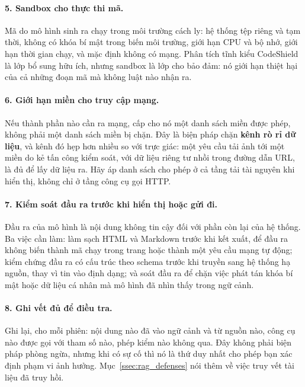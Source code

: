 \paragraph{5. Sandbox cho thực thi mã.} Mã do mô hình sinh ra chạy trong môi trường cách ly: hệ thống tệp riêng và tạm thời, không có khóa bí mật trong biến môi trường, giới hạn CPU và bộ nhớ, giới hạn thời gian chạy, và mặc định không có mạng. Phân tích tĩnh kiểu CodeShield là lớp bổ sung hữu ích, nhưng sandbox là lớp cho bảo đảm: nó giới hạn thiệt hại của cả những đoạn mã mà không luật nào nhận ra.

\paragraph{6. Giới hạn miền cho truy cập mạng.} Nếu thành phần nào cần ra mạng, cấp cho nó một danh sách miền được phép, không phải một danh sách miền bị chặn. Đây là biện pháp chặn \textbf{kênh rò rỉ dữ liệu}, và kênh đó hẹp hơn nhiều so với trực giác: một yêu cầu tải ảnh tới một miền do kẻ tấn công kiểm soát, với dữ liệu riêng tư nhồi trong đường dẫn URL, là đủ để lấy dữ liệu ra. Hãy áp danh sách cho phép ở cả tầng tải tài nguyên khi hiển thị, không chỉ ở tầng công cụ gọi HTTP.

\paragraph{7. Kiểm soát đầu ra trước khi hiển thị hoặc gửi đi.} Đầu ra của mô hình là nội dung không tin cậy đối với phần còn lại của hệ thống. Ba việc cần làm: làm sạch HTML và Markdown trước khi kết xuất, để đầu ra không biến thành mã chạy trong trang hoặc thành một yêu cầu mạng tự động; kiểm chứng đầu ra có cấu trúc theo schema trước khi truyền sang hệ thống hạ nguồn, thay vì tin vào định dạng; và soát đầu ra để chặn việc phát tán khóa bí mật hoặc dữ liệu cá nhân mà mô hình đã nhìn thấy trong ngữ cảnh.

\paragraph{8. Ghi vết đủ để điều tra.} Ghi lại, cho mỗi phiên: nội dung nào đã vào ngữ cảnh và từ nguồn nào, công cụ nào được gọi với tham số nào, phép kiểm nào không qua. Đây không phải biện pháp phòng ngừa, nhưng khi có sự cố thì nó là thứ duy nhất cho phép bạn xác định phạm vi ảnh hưởng. Mục~\ref{ssec:rag_defenses} nói thêm về việc truy vết tài liệu đã truy hồi.

